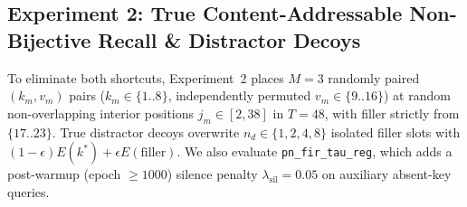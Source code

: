 \documentclass[11pt,a4paper]{article}
\begin{document}
\subsection{Experiment 2: True Content-Addressable Non-Bijective Recall \& Distractor Decoys}

To eliminate both shortcuts, Experiment~2 places $M=3$ randomly paired $(k_m, v_m)$ pairs ($k_m \in \{1..8\}$, independently permuted $v_m \in \{9..16\}$) at random non-overlapping interior positions $j_m \in [2, 38]$ in $T=48$, with filler strictly from $\{17..23\}$. True distractor decoys overwrite $n_d \in \{1,2,4,8\}$ isolated filler slots with $(1-\epsilon)E(k^*) + \epsilon E(\text{filler})$. We also evaluate \texttt{pn\_fir\_tau\_reg}, which adds a post-warmup (epoch $\ge 1000$) silence penalty $\lambda_{\text{sil}} = 0.05$ on auxiliary absent-key queries.
\end{document}
